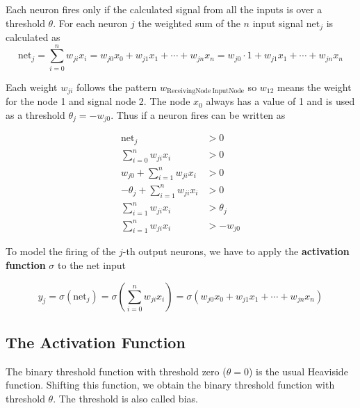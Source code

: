 \documentclass[11pt]{article}
\begin{document}
Each neuron fires only if the calculated signal from all the inputs is over a threshold $\theta$. For each neuron $j$ the weighted sum of the $n$ input signal $\text{net}_j$ is calculated as
\begin{equation}
    \text{net}_j = \sum_{i=0}^{n} w_{ji} x_i = w_{j0}x_0 + w_{j1}x_1 + \cdots + w_{jn}x_n = w_{j0} \cdot 1 + w_{j1}x_1 + \cdots + w_{jn}x_n
\end{equation}

Each weight $w_{ji}$ follows the pattern $w_{\text{ReceivingNode}\ \text{InputNode}}$ so $w_{12}$ means the weight for the node 1 and signal node 2. The node $x_0$ always has a value of 1 and is used as a threshold $\theta_j = -w_{j0}$. Thus if a neuron fires can be written as

\begin{align*}
    \text{net}_j &> 0\\
    \sum_{i=0}^{n} w_{ji} x_i &> 0\\
    w_{j0} + \sum_{i=1}^{n} w_{ji} x_i &> 0\\
    -\theta_j + \sum_{i=1}^{n} w_{ji} x_i &> 0\\
    \sum_{i=1}^{n} w_{ji} x_i &> \theta_j\\
    \sum_{i=1}^{n} w_{ji} x_i &> -w_{j0}
\end{align*}

To model the firing of the $j$-th output neurons, we have to apply the \textbf{activation function} $\sigma$ to the net input

\begin{equation}
    y_j = \sigma(\text{net}_j) = \sigma(\sum_{i=0}^{n} w_{ji} x_i) = \sigma(w_{j0}x_0 + w_{j1}x_1 + \cdots + w_{jn}x_n)
\end{equation}

\subsection{The Activation Function}
The binary threshold function with threshold zero ($\theta = 0$) is the usual Heaviside function. Shifting this function, we obtain the binary threshold function with threshold $\theta$. The threshold is also called bias.
\end{document}
